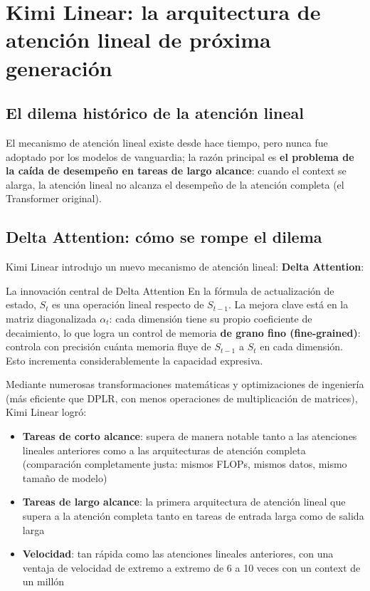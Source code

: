 \documentclass[a4paper]{article}
\begin{document}
\section{Kimi Linear: la arquitectura de atención lineal de próxima generación}

\subsection{El dilema histórico de la atención lineal}

El mecanismo de atención lineal existe desde hace tiempo, pero nunca fue adoptado por los modelos de vanguardia; la razón principal es \textbf{el problema de la caída de desempeño en tareas de largo alcance}: cuando el context se alarga, la atención lineal no alcanza el desempeño de la atención completa (el Transformer original).

\subsection{Delta Attention: cómo se rompe el dilema}

Kimi Linear introdujo un nuevo mecanismo de atención lineal: \textbf{Delta Attention}:

\begin{importantbox}{La innovación central de Delta Attention}
En la fórmula de actualización de estado, $S_t$ es una operación lineal respecto de $S_{t-1}$. La mejora clave está en la matriz diagonalizada $\alpha_t$: cada dimensión tiene su propio coeficiente de decaimiento, lo que logra un control de memoria \textbf{de grano fino (fine-grained)}: controla con precisión cuánta memoria fluye de $S_{t-1}$ a $S_t$ en cada dimensión. Esto incrementa considerablemente la capacidad expresiva.
\end{importantbox}

Mediante numerosas transformaciones matemáticas y optimizaciones de ingeniería (más eficiente que DPLR, con menos operaciones de multiplicación de matrices), Kimi Linear logró:

\begin{itemize}
\item \textbf{Tareas de corto alcance}: supera de manera notable tanto a las atenciones lineales anteriores como a las arquitecturas de atención completa (comparación completamente justa: mismos FLOPs, mismos datos, mismo tamaño de modelo)
\item \textbf{Tareas de largo alcance}: la primera arquitectura de atención lineal que supera a la atención completa tanto en tareas de entrada larga como de salida larga
\item \textbf{Velocidad}: tan rápida como las atenciones lineales anteriores, con una ventaja de velocidad de extremo a extremo de 6 a 10 veces con un context de un millón
\end{itemize}
\end{document}
